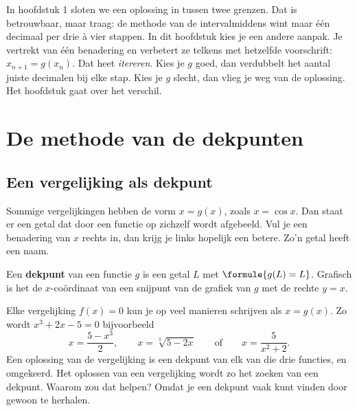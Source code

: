 In hoofdstuk 1 sloten we een oplossing in tussen twee grenzen. Dat is betrouwbaar, maar traag: de methode van de intervalmiddens wint maar één decimaal per drie à vier stappen. In dit hoofdstuk kies je een andere aanpak. Je vertrekt van één benadering en verbetert ze telkens met hetzelfde voorschrift: $x_{n+1} = g(x_n)$. Dat heet \textit{itereren}. Kies je $g$ goed, dan verdubbelt het aantal juiste decimalen bij elke stap. Kies je $g$ slecht, dan vlieg je weg van de oplossing. Het hoofdstuk gaat over het verschil.

\begin{oefeningen}[Start]

\end{oefeningen}


\section{De methode van de dekpunten}

\subsection{Een vergelijking als dekpunt}

Sommige vergelijkingen hebben de vorm $x = g(x)$, zoals $x = \cos x$. Dan staat er een getal dat door een functie op zichzelf wordt afgebeeld. Vul je een benadering van $x$ rechts in, dan krijg je links hopelijk een betere. Zo'n getal heeft een naam.

\begin{theorie}
Een \textbf{\textcolor{accent}{dekpunt}} van een functie $g$ is een getal $L$ met $\formule{g(L) = L}$. Grafisch is het de $x$-coördinaat van een snijpunt van de grafiek van $g$ met de rechte $y = x$.
\end{theorie}

Elke vergelijking $f(x) = 0$ kun je op veel manieren schrijven als $x = g(x)$. Zo wordt $x^3 + 2x - 5 = 0$ bijvoorbeeld
\[
x = \frac{5 - x^3}{2}, \qquad x = \sqrt[3]{5 - 2x} \qquad \text{of} \qquad x = \frac{5}{x^2 + 2} .
\]
Een oplossing van de vergelijking is een dekpunt van elk van die drie functies, en omgekeerd. Het oplossen van een vergelijking wordt zo het zoeken van een dekpunt. Waarom zou dat helpen? Omdat je een dekpunt vaak kunt vinden door gewoon te herhalen.

